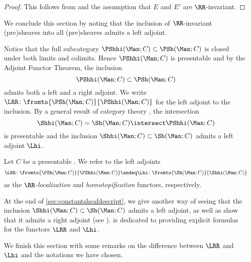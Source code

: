 \begin{proof}
	This follows from  and the assumption that $ E $ and $ E' $ are $ \RR $-invariant.
\end{proof}

We conclude this section by noting that the inclusion of $ \RR $-invariant (pre)sheaves into all (pre)sheaves admits a left adjoint.

\begin{observation}\label{obs:LRRandLhi}
	Notice that the full subcategory $ \PShhi(\Man;C) \subset \PSh(\Man;C) $ is closed under both limits and colimits.
	Hence $ \PShhi(\Man;C) $ is presentable and by the Adjoint Functor Theorem, the inclusion
	\begin{equation*}
		\PShhi(\Man;C) \subset \PSh(\Man;C)
	\end{equation*}
	admits both a left and a right adjoint.
	We write $ \LRR \colon \fromto{\PSh(\Man;C)}{\PShhi(\Man;C)} $ for the left adjoint to the inclusion.
	By a general result of category theory , the intersection 
	\begin{equation*}
		\Shhi(\Man;C) = \Sh(\Man;C) \intersect \PShhi(\Man;C)
	\end{equation*}
	is presentable and the inclusion $ \Shhi(\Man;C) \subset \Sh(\Man;C) $ admits a left adjoint $ \Lhi $.
\end{observation}
	
\begin{definition}\label{homotopification_definition}
	Let $ C $ be a presentable \category.
	We refer to the left adjoints
	\begin{equation*}
		\LRR \colon \fromto{\PSh(\Man;C)}{\PShhi(\Man;C)} \andeq \Lhi \colon \fromto{\Sh(\Man;C)}{\Shhi(\Man;C)}
	\end{equation*}
	as the \emph{$ \RR $-localization} and \emph{homotopification} functors, respectively.
\end{definition}

At the end of \cref{sec:constantsheafdescript}, we give another way of seeing that the inclusion $ \Shhi(\Man;C) \subset \Sh(\Man;C) $ admits a left adjoint, as well as show that it admits a right adjoint (see ).
 is dedicated to providing explicit formulas for the functors $ \LRR $ and $ \Lhi $.

We finish this section with some remarks on the difference between $ \LRR $ and $ \Lhi $ and the notations we have chosen.

